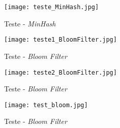 \documentclass{report}
\begin{document}
\begin{figure} [h]
\center
\texttt{[image: teste\_MinHash.jpg]}
\caption{Teste - \textit{MinHash}}
\end{figure}
	
\begin{figure} [h]
\center
\texttt{[image: teste1\_BloomFilter.jpg]}
\caption{Teste - \textit{Bloom Filter}}
\end{figure}

\begin{figure} [h]
\center
\texttt{[image: teste2\_BloomFilter.jpg]}
\caption{Teste - \textit{Bloom Filter}}
\end{figure}

\begin{figure} [h]
\center
\texttt{[image: test\_bloom.jpg]}
\caption{Teste - \textit{Bloom Filter}}
\end{figure}


\end{document}
